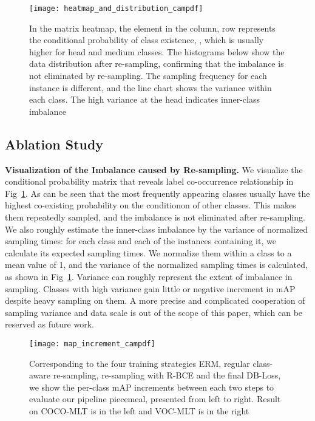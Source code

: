 \documentclass[runningheads]{llncs}
\begin{document}
\begin{figure}[t]
    \centering
    \texttt{[image: heatmap\_and\_distribution\_campdf]}
    \caption{
        In the matrix heatmap, the element in the  column,  row represents the conditional probability of class existence, , which is usually higher for head and medium classes.
        The histograms below show the data distribution after re-sampling, confirming that the imbalance is not eliminated by re-sampling.
        The sampling frequency for each instance is different, and the line chart shows the variance within each class. The high variance at the head indicates inner-class imbalance
        }
    \label{fig:heatmap_and_distribution}
\end{figure}

\subsection{Ablation Study}

\noindent\textbf{Visualization of the Imbalance caused by Re-sampling.}
We visualize the conditional probability matrix that reveals label co-occurrence relationship in Fig~\ref{fig:heatmap_and_distribution}. As can be seen that the most frequently appearing classes usually have the highest co-existing probability on the conditionon of other classes. This makes them repeatedly sampled, and the imbalance is not eliminated after re-sampling.
We also roughly estimate the inner-class imbalance by the variance of normalized sampling times: 
for each class and each of the instances containing it, we calculate its expected sampling times. We normalize them within a class to a mean value of 1, and the variance of the normalized sampling times is calculated, as shown in Fig~\ref{fig:heatmap_and_distribution}. 
Variance can roughly represent the extent of imbalance in sampling.
Classes with high variance gain little or negative increment in mAP despite heavy sampling on them. 
A more precise and complicated cooperation of sampling variance and data scale is out of the scope of this paper, which can be reserved as future work.
\begin{figure}[t]
    \centering
    \texttt{[image: map\_increment\_campdf]}
    \caption{
    Corresponding to the four training strategies \ie ERM, regular class-aware re-sampling, re-sampling with R-BCE and the final DB-Loss, we show the per-class mAP increments between each two steps to evaluate our pipeline piecemeal, presented from left to right.
    Result on COCO-MLT is in the left and VOC-MLT is in the right
    } 
    \label{fig:map_increment}
\end{figure}
\end{document}
